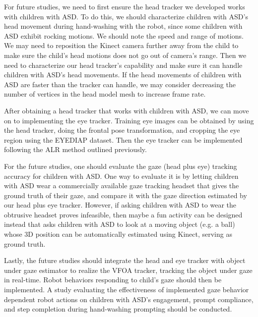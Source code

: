 For future studies, we need to first ensure the head tracker we developed works with children with ASD.  To do this, we should characterize children with ASD's head movement during hand-washing with the robot, since some children with ASD exhibit rocking motions.  We should note the speed and range of motions.  We may need to reposition the Kinect camera further away from the child to make sure the child's head motions does not go out of camera's range.  Then we need to characterize our head tracker's capability and make sure it can handle children with ASD's head movements.  If the head movements of children with ASD are faster than the tracker can handle, we may consider decreasing the number of vertices in the head model mesh to increase frame rate.

After obtaining a head tracker that works with children with ASD, we can move on to implementing the eye tracker.  Training eye images can be obtained by using the head tracker, doing the frontal pose transformation, and cropping the eye region using the EYEDIAP dataset.  Then the eye tracker can be implemented following the ALR method outlined previously.

For the future studies, one should evaluate the gaze (head plus eye) tracking accuracy for children with ASD.  One way to evaluate it is by letting children with ASD wear a commercially available gaze tracking headset that gives the ground truth of their gaze, and compare it with the gaze direction estimated by our head plus eye tracker.  However, if asking children with ASD to wear the obtrusive headset proves infeasible, then maybe a fun activity can be designed instead that asks children with ASD to look at a moving object (e.g. a ball) whose 3D position can be automatically estimated using Kinect, serving as ground truth.

Lastly, the future studies should integrate the head and eye tracker with object under gaze estimator to realize the VFOA tracker, tracking the object under gaze in real-time.  Robot behaviors responding to child's gaze should then be implemented.  A study evaluating the effectiveness of implemented gaze behavior dependent robot actions on children with ASD's engagement, prompt compliance, and step completion during hand-washing prompting should be conducted.